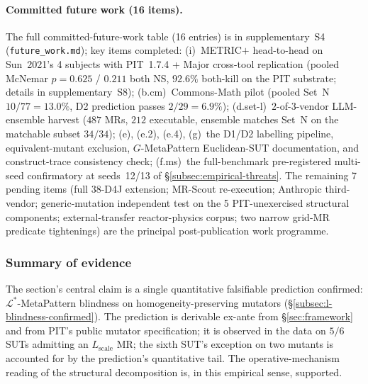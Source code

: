 \documentclass[acmsmall,screen,review]{acmart}
\begin{document}
\paragraph{Committed future work (16 items).}
\label{para:future-work}
The full committed-future-work table (16 entries) is in supplementary~S4 (\texttt{future\_work.md}); key items completed: (i)~METRIC$+$ head-to-head on Sun~2021's 4 subjects with PIT~1.7.4 + Major cross-tool replication (pooled McNemar $p = 0.625$ / $0.211$ both NS, $92.6\%$ both-kill on the PIT substrate; details in supplementary~S8); (b.cm)~Commons-Math pilot (pooled Set~N $10/77 = 13.0\%$, D2 prediction passes $2/29 = 6.9\%$); (d.set-l)~$2$-of-$3$-vendor LLM-ensemble harvest ($487$ MRs, $212$ executable, ensemble matches Set~N on the matchable subset $34/34$); (e), (e.2), (e.4), (g)~the D1/D2 labelling pipeline, equivalent-mutant exclusion, $G$-MetaPattern Euclidean-SUT documentation, and construct-trace consistency check; (f.ms)~the full-benchmark pre-registered multi-seed confirmatory at seeds~12/13 of \S\ref{subsec:empirical-threats}. The remaining 7 pending items (full $38$-D4J extension; MR-Scout re-execution; Anthropic third-vendor; generic-mutation independent test on the 5 PIT-unexercised structural components; external-transfer reactor-physics corpus; two narrow grid-MR predicate tightenings) are the principal post-publication work programme.

\subsubsection{Summary of evidence}
\label{subsec:empirical-summary}

The section's central claim is a single quantitative falsifiable
prediction confirmed: $\mathcal{L}^{*}$-MetaPattern blindness on
homogeneity-preserving mutators
(\S\ref{subsec:l-blindness-confirmed}). The prediction is derivable
ex-ante from \S\ref{sec:framework} and from PIT's public mutator
specification; it is observed in the data on $5/6$ SUTs admitting an
$L_{\mathrm{scale}}$ MR; the sixth SUT's exception on two mutants is
accounted for by the prediction's quantitative tail. The
operative-mechanism reading of the structural decomposition is, in
this empirical sense, supported.
\end{document}
